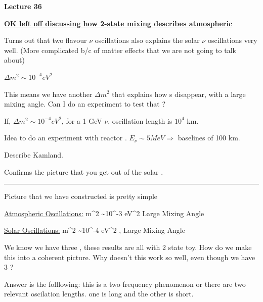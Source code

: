 \usepackage{fancyhdr}

\fancyhf{}


\thispagestyle{fancy}

\begin{center}
{\huge \textbf{Lecture 36}}
\end{center}

{\fontsize{14}{16}\selectfont

\textbf{\underline{OK left off discussing how 2-state mixing describes atmospheric \nus}} 

Turns out that two flavour $\nu$ oscillations also explains the solar $\nu$ oscillations very well. 
(More complicated b/c of matter effects that we are not going to talk about)

$\Delta m^2 \sim 10^{-4} eV^2$ 

This means we have another $\Delta m^2$ that explains how \nue s disappear, with a large mixing angle. 
Can I do an experiment to test that ?

If,  $\Delta m^2 \sim 10^{-4} eV^2$,  for a 1 GeV $\nu$, oscillation length is $10^4$ km. 

Idea to do an experiment with reactor \nus.
$E_\nu \sim 5 MeV \Rightarrow $ baselines of 100 km. 

Describe Kamland. 

Confirms the picture that you get out of the solar \nus.

\noindent\rule{\textwidth}{1pt}

Picture that we have constructed is pretty simple

\underline{Atmospheric Oscillations:}
\be
\Delta m^2 \sim 10^{-3} eV^2
\ee
\be
\numu \longleftrightarrow \nutau
\ee
\bc
Large Mixing Angle
\ec

\underline{Solar Oscillations:}
\be
\Delta m^2 \sim 10^{-4} eV^2
\ee
\be
\nue \longleftrightarrow \numu,\nutau
\ee
\bc
Large Mixing Angle
\ec

We know we have three \nus, these results are all with 2 state toy. 
How do we make this into a coherent picture. 
Why doesn't this work so well, even though we have 3 \nus?

Answer is the folllowing:
 this is a two frequency phenomenon or there are two relevant oscilation lengths.
 one is long and the other is short. 

}
